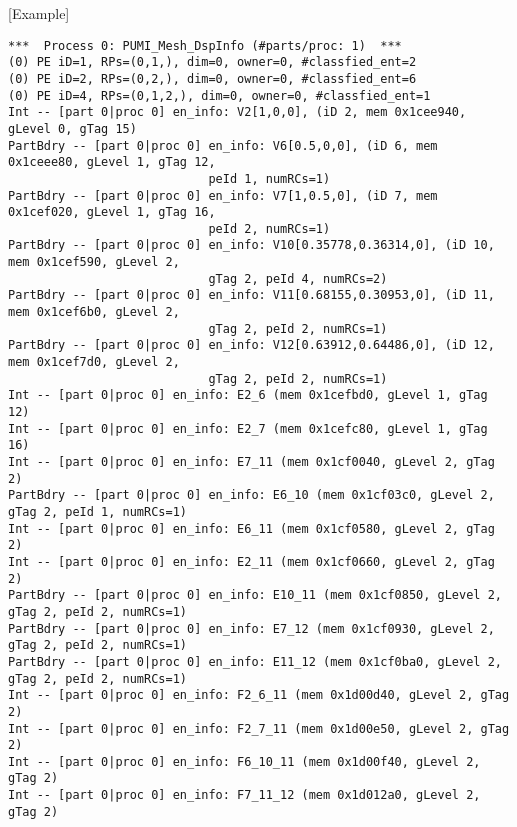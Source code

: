 [Example]
\begin{small}
\begin{verbatim}
***  Process 0: PUMI_Mesh_DspInfo (#parts/proc: 1)  ***
(0) PE iD=1, RPs=(0,1,), dim=0, owner=0, #classfied_ent=2
(0) PE iD=2, RPs=(0,2,), dim=0, owner=0, #classfied_ent=6
(0) PE iD=4, RPs=(0,1,2,), dim=0, owner=0, #classfied_ent=1
Int -- [part 0|proc 0] en_info: V2[1,0,0], (iD 2, mem 0x1cee940, gLevel 0, gTag 15)
PartBdry -- [part 0|proc 0] en_info: V6[0.5,0,0], (iD 6, mem 0x1ceee80, gLevel 1, gTag 12, 
                            peId 1, numRCs=1)
PartBdry -- [part 0|proc 0] en_info: V7[1,0.5,0], (iD 7, mem 0x1cef020, gLevel 1, gTag 16, 
                            peId 2, numRCs=1)
PartBdry -- [part 0|proc 0] en_info: V10[0.35778,0.36314,0], (iD 10, mem 0x1cef590, gLevel 2, 
                            gTag 2, peId 4, numRCs=2)
PartBdry -- [part 0|proc 0] en_info: V11[0.68155,0.30953,0], (iD 11, mem 0x1cef6b0, gLevel 2, 
                            gTag 2, peId 2, numRCs=1)
PartBdry -- [part 0|proc 0] en_info: V12[0.63912,0.64486,0], (iD 12, mem 0x1cef7d0, gLevel 2, 
                            gTag 2, peId 2, numRCs=1)
Int -- [part 0|proc 0] en_info: E2_6 (mem 0x1cefbd0, gLevel 1, gTag 12)
Int -- [part 0|proc 0] en_info: E2_7 (mem 0x1cefc80, gLevel 1, gTag 16)
Int -- [part 0|proc 0] en_info: E7_11 (mem 0x1cf0040, gLevel 2, gTag 2)
PartBdry -- [part 0|proc 0] en_info: E6_10 (mem 0x1cf03c0, gLevel 2, gTag 2, peId 1, numRCs=1)
Int -- [part 0|proc 0] en_info: E6_11 (mem 0x1cf0580, gLevel 2, gTag 2)
Int -- [part 0|proc 0] en_info: E2_11 (mem 0x1cf0660, gLevel 2, gTag 2)
PartBdry -- [part 0|proc 0] en_info: E10_11 (mem 0x1cf0850, gLevel 2, gTag 2, peId 2, numRCs=1)
PartBdry -- [part 0|proc 0] en_info: E7_12 (mem 0x1cf0930, gLevel 2, gTag 2, peId 2, numRCs=1)
PartBdry -- [part 0|proc 0] en_info: E11_12 (mem 0x1cf0ba0, gLevel 2, gTag 2, peId 2, numRCs=1)
Int -- [part 0|proc 0] en_info: F2_6_11 (mem 0x1d00d40, gLevel 2, gTag 2)
Int -- [part 0|proc 0] en_info: F2_7_11 (mem 0x1d00e50, gLevel 2, gTag 2)
Int -- [part 0|proc 0] en_info: F6_10_11 (mem 0x1d00f40, gLevel 2, gTag 2)
Int -- [part 0|proc 0] en_info: F7_11_12 (mem 0x1d012a0, gLevel 2, gTag 2)


\end{verbatim}
\end{small}
